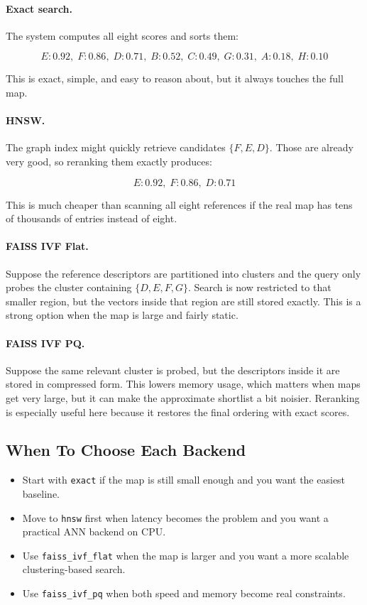 \documentclass[11pt]{article}
\begin{document}
\paragraph{Exact search.}
The system computes all eight scores and sorts them:

\[
E:0.92,\; F:0.86,\; D:0.71,\; B:0.52,\; C:0.49,\; G:0.31,\; A:0.18,\; H:0.10
\]

This is exact, simple, and easy to reason about, but it always touches the full map.

\paragraph{HNSW.}
The graph index might quickly retrieve candidates \(\{F,E,D\}\). Those are already very good, so reranking them exactly produces:

\[
E:0.92,\; F:0.86,\; D:0.71
\]

This is much cheaper than scanning all eight references if the real map has tens of thousands of entries instead of eight.

\paragraph{FAISS IVF Flat.}
Suppose the reference descriptors are partitioned into clusters and the query only probes the cluster containing \(\{D,E,F,G\}\). Search is now restricted to that smaller region, but the vectors inside that region are still stored exactly. This is a strong option when the map is large and fairly static.

\paragraph{FAISS IVF PQ.}
Suppose the same relevant cluster is probed, but the descriptors inside it are stored in compressed form. This lowers memory usage, which matters when maps get very large, but it can make the approximate shortlist a bit noisier. Reranking is especially useful here because it restores the final ordering with exact scores.

\subsection{When To Choose Each Backend}
\begin{itemize}[leftmargin=*]
  \item Start with \texttt{exact} if the map is still small enough and you want the easiest baseline.
  \item Move to \texttt{hnsw} first when latency becomes the problem and you want a practical ANN backend on CPU.
  \item Use \texttt{faiss\_ivf\_flat} when the map is larger and you want a more scalable clustering-based search.
  \item Use \texttt{faiss\_ivf\_pq} when both speed and memory become real constraints.
\end{itemize}
\end{document}

